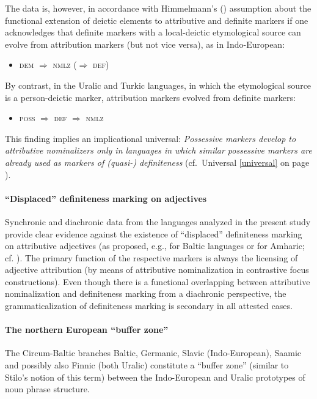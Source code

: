 The data is, however, in accordance with Himmelmann's (\citeyear[220–221]{himmelmann1997}) assumption about the functional extension of deictic elements to attributive and definite markers if one acknowledges that definite markers with a local-deictic etymological source can evolve from attribution markers (but not vice versa), as in Indo-European:
\begin{itemize}
\item \textsc{dem $\Rightarrow$ nmlz ($\Rightarrow$ def)}
\end{itemize}
By contrast, in the Uralic and Turkic languages, in which the etymological source is a person-deictic marker, attribution markers evolved from definite markers:
\begin{itemize}
\item \textsc{poss $\Rightarrow$ def $\Rightarrow$ nmlz}
\end{itemize}
This finding implies an implicational universal: \textit{Possessive markers develop to attributive nominalizers only in languages in which similar possessive markers are already used as markers of (quasi-) definiteness} (cf.~Universal \ref{universal} on page \pageref{universal}).

\paragraph*{“Displaced” definiteness marking on adjectives}
Synchronic and diachronic data from the languages analyzed in the present study provide clear evidence against the existence of “displaced” definiteness marking on attributive adjectives (as proposed, e.g., for Baltic languages or for Amharic; cf. \citealt[122]{dahl2015a}). The primary function of the respective markers is always the licensing of adjective attribution (by means of attributive nominalization in contrastive focus constructions). Even though there is a functional overlapping between attributive nominalization and definiteness marking from a diachronic perspective, the grammaticalization of definiteness marking is secondary in all attested cases.

\paragraph*{The northern European “buffer zone”}
The Circum-Baltic branches Baltic, Germanic, Slavic (Indo-European), Saamic and possibly also Finnic (both Uralic) constitute a “buffer zone” (similar to Stilo's \citeyear{stilo2005} notion of this term) between the Indo-European and Uralic prototypes of noun phrase structure.

